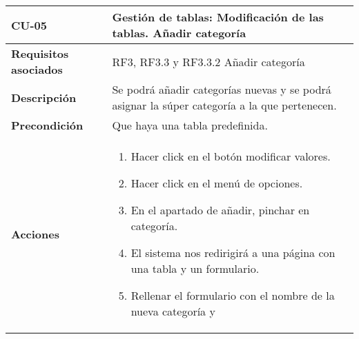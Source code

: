\newpage
\begin{longtable}[H]{@{}ll@{}}
\toprule
\begin{minipage}[b]{0.23\columnwidth}\raggedright\strut
\textbf{CU-05}\strut
\end{minipage} & \begin{minipage}[b]{0.71\columnwidth}\raggedright\strut
\textbf{Gestión de tablas: Modificación de las tablas. Añadir categoría}\strut
\end{minipage}\tabularnewline
\midrule
\endhead
\begin{minipage}[t]{0.23\columnwidth}\raggedright\strut
\textbf{Requisitos asociados}\strut
\end{minipage} & \begin{minipage}[t]{0.71\columnwidth}\raggedright\strut
RF3, RF3.3 y RF3.3.2 Añadir categoría\strut
\end{minipage}\tabularnewline
\begin{minipage}[t]{0.23\columnwidth}\raggedright\strut
\textbf{Descripción}\strut
\end{minipage} & \begin{minipage}[t]{0.71\columnwidth}\raggedright\strut
Se podrá añadir categorías nuevas y se podrá asignar la súper categoría a la
que pertenecen.
\strut
\end{minipage}\tabularnewline
\begin{minipage}[t]{0.23\columnwidth}\raggedright\strut
\textbf{Precondición}\strut
\end{minipage} & \begin{minipage}[t]{0.71\columnwidth}\raggedright\strut
Que haya una tabla predefinida.\strut
\end{minipage}\tabularnewline
\begin{minipage}[t]{0.23\columnwidth}\raggedright\strut
\textbf{Acciones}\strut
\end{minipage} & \begin{minipage}[t]{0.71\columnwidth}\raggedright\strut
\begin{enumerate}
\def\labelenumi{\arabic{enumi}.}
\tightlist
\item
Hacer click en el botón modificar valores.
\item
Hacer click en el menú de opciones.
\item
En el apartado de añadir, pinchar en categoría.
\item
El sistema nos redirigirá a una página con una tabla y un
formulario.
\item 
Rellenar el formulario con el nombre de la nueva categoría y

\end{enumerate}
\end{minipage}
\end{longtable}
